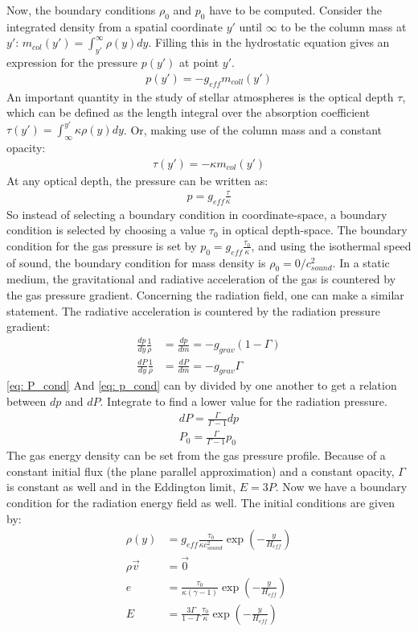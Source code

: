 Now, the boundary conditions $\rho_0$ and $p_0$ have to be computed. Consider the integrated density from a  spatial coordinate $y'$ until $\infty$ to be the column mass at $y'$: $m_{col}(y') = \int^\infty_{y'} \rho(y) dy$. Filling this in the hydrostatic equation gives an expression for the pressure $p(y')$ at point $y'$.
\begin{align}
p(y') = -g_{eff} m_{coll}(y')
\end{align}
An important quantity in the study of stellar atmospheres is the optical depth $\tau$, which can be defined as the length integral over the absorption coefficient $\tau(y') = \int_\infty^{y'} \kappa \rho(y) dy$. Or, making use of the column mass and a constant opacity:
\begin{align}
\tau(y') = -\kappa m_{col}(y') \label{eq: opt_depth}
\end{align}
At any optical depth, the pressure can be written as: 
\begin{align}
p = g_{eff}\frac{\tau}{\kappa}
\end{align}
So instead of selecting a boundary condition in coordinate-space, a boundary condition is selected by choosing a value $\tau_0$ in optical depth-space. The boundary condition for the gas pressure is set by $p_0 = g_{eff}\frac{\tau_0}{\kappa}$, and using the isothermal speed of sound, the boundary condition for mass density is $\rho_0 = 0/c_{sound}^2$. In a static medium, the gravitational and radiative acceleration of the gas is countered by the gas pressure gradient. Concerning the radiation field, one can make a similar statement. The radiative acceleration is countered by the radiation pressure gradient:
\begin{align}
\frac{dp}{dy} \frac{1}{\rho} &= \frac{dp}{dm} = -g_{grav}(1 - \Gamma) \label{eq: p_cond} \\
\frac{dP}{dy} \frac{1}{\rho} &= \frac{dP}{dm} = -g_{grav} \Gamma \label{eq: P_cond}
\end{align}
\eqref{eq: P_cond} And \eqref{eq: p_cond} can by divided by one another to get a relation between $dp$ and $dP$. Integrate to find a lower value for the radiation pressure.
\begin{align}
dP = \frac{\Gamma}{\Gamma-1} dp \\
P_0 = \frac{\Gamma}{\Gamma-1} p_0
\end{align}
The gas energy density can be set from the gas pressure profile. Because of a constant initial flux (the plane parallel approximation) and a constant opacity, $\Gamma$ is constant as well and in the Eddington limit, $E=3P$. Now we have a boundary condition for the radiation energy field as well. The initial conditions are given by:
\begin{align}
\rho(y) &= g_{eff} \frac{\tau_0}{\kappa c_{sound}^2} \exp \left( -\frac{y}{H_{eff}} \right) \\
\rho \vec{v} &= \vec{0} \\
e &= \frac{\tau_0}{\kappa (\gamma - 1)} \exp \left( -\frac{y}{H_{eff}} \right) \\
E &= \frac{3 \Gamma}{1-\Gamma} \frac{\tau_0}{\kappa} \exp \left( -\frac{y}{H_{eff}} \right) \\
\end{align}

